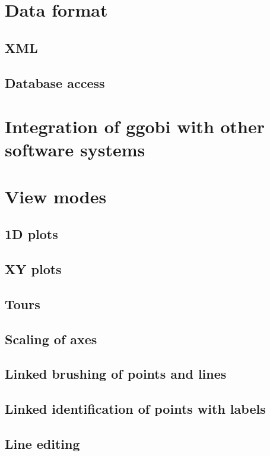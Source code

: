 \documentclass[11pt]{article}
\begin{document}
\section{Data format}
\label{slbl:DataFormat}
\subsection {XML}
\label{slbl:XML}
\subsection {Database access}
\label{slbl:MySQL}

\section{Integration of ggobi with other software systems}
\label{slbl:Integration}

\section{View modes}
\label{slbl:ViewModes}

\subsection{1D plots}
\subsection{XY plots}
\subsection{Tours}
\label{slbl:1DTour}
\subsection{Scaling of axes}
\label{slbl:Scaling}
\subsection{Linked brushing of points and lines}
\label{slbl:Color}
\subsection{Linked identification of points with labels}
\subsection{Line editing}
\end{document}
